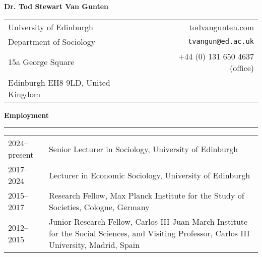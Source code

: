 \documentclass[12pt,letterpaper]{article}
\newcommand{\sectionhead}[1]{\begin{flushleft}\large\bf{#1}\vspace{.1cm}\hrule\end{flushleft}}
\begin{document}
\begin{center}
\textbf{Dr. Tod Stewart Van Gunten}\vspace{0.3cm}
\end{center}

\noindent
\begin{tabularx}{\textwidth}{@{}Xr@{}}
	University of Edinburgh & \url{todvangunten.com}\\
	Department of Sociology & \texttt{tvangun@ed.ac.uk} \\
	15a George Square & +44 (0) 131 650 4637 (office)  \\
	Edinburgh EH8 9LD, United Kingdom&\\
\end{tabularx}


\sectionhead{Employment}
\begin{tabulary}{.96\textwidth}{@{}p{2.5cm} L}
	
2024--present & Senior Lecturer in Sociology, University of Edinburgh \vspace{0.2cm}\\

2017--2024	& Lecturer in Economic Sociology, University of Edinburgh \vspace{0.2cm}\\

2015--2017 & Research Fellow, Max Planck Institute for the Study of Societies, Cologne, Germany\vspace{0.2cm}\\

2012--2015 & Junior Research Fellow, Carlos III-Juan March Institute for the Social Sciences, and Visiting Professor, Carlos III University, Madrid, Spain\vspace{0.2cm}\\


\end{tabulary}
\end{document}
